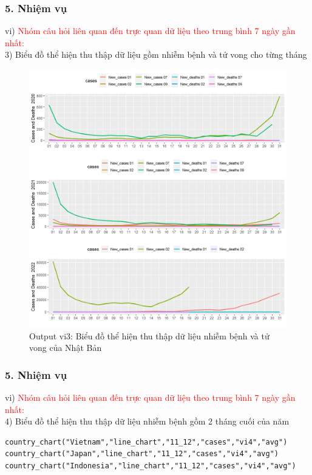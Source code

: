 \documentclass[english,10pt,table]{beamer}
\begin{document}
\begin{frame}[fragile]
\frametitle{5.  Nhiệm vụ}
vi) \textcolor{red}{Nhóm câu hỏi liên quan đến trực quan dữ liệu theo trung bình 7 ngày gần nhất:}\\
    3) Biểu đồ thể hiện thu thập dữ liệu gồm nhiễm bệnh và tử vong cho từng tháng
	\begin{figure}[h!]
	\begin{center}
		    \includegraphics[scale = 0.26]{Images/VI/vi3 Japan .jpeg}
		     \caption{Output vi3: Biểu đồ thể hiện thu thập dữ liệu nhiễm bệnh và tử vong của Nhật Bản}
		\end{center}
		\end{figure}
\end{frame}

\begin{frame}[fragile]
\frametitle{5.  Nhiệm vụ}
vi) \textcolor{red}{Nhóm câu hỏi liên quan đến trực quan dữ liệu theo trung bình 7 ngày gần nhất:}\\
    4) Biểu đồ thể hiện thu thập dữ liệu nhiễm bệnh gồm 2 tháng cuối của năm
    \begin{lstlisting}[frame=single,basicstyle=\tiny]  
country_chart("Vietnam","line_chart","11_12","cases","vi4","avg")
country_chart("Japan","line_chart","11_12","cases","vi4","avg")
country_chart("Indonesia","line_chart","11_12","cases","vi4","avg")
		\end{lstlisting}
\end{frame}
\end{document}
